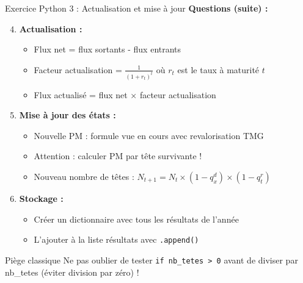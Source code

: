 \documentclass[10pt,aspectratio=169]{beamer}
\begin{document}
\begin{frame}{Exercice Python 3 : Actualisation et mise à jour}
\textbf{Questions (suite) :}

\begin{enumerate}
    \setcounter{enumi}{3}
    \item \textbf{Actualisation :}
    \begin{itemize}
        \item Flux net = flux sortants - flux entrants
        \item Facteur actualisation = $\frac{1}{(1+r_t)^t}$ où $r_t$ est le taux à maturité $t$
        \item Flux actualisé = flux net × facteur actualisation
    \end{itemize}
    
    \item \textbf{Mise à jour des états :}
    \begin{itemize}
        \item Nouvelle PM : formule vue en cours avec revalorisation TMG
        \item Attention : calculer PM par tête survivante !
        \item Nouveau nombre de têtes : $N_{t+1} = N_t \times (1-q_x^d) \times (1-q_t^r)$
    \end{itemize}
    
    \item \textbf{Stockage :}
    \begin{itemize}
        \item Créer un dictionnaire avec tous les résultats de l'année
        \item L'ajouter à la liste résultats avec \texttt{.append()}
    \end{itemize}
\end{enumerate}

\begin{exampleblock}{Piège classique}
Ne pas oublier de tester \texttt{if nb\_tetes > 0} avant de diviser par nb\_tetes (éviter division par zéro) !
\end{exampleblock}
\end{frame}
\end{document}
